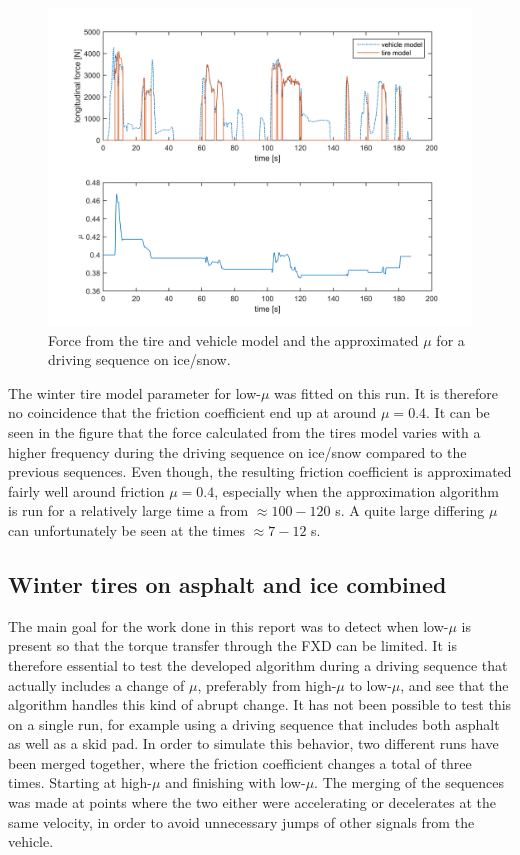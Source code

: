 \begin{figure}[h]
	\centering
	\includegraphics[width=1.0\textwidth]{Pictures/force_mue_ice_normal}
	\caption {Force from the tire and vehicle model and the approximated $ \mu $ for a driving sequence on ice/snow.}
	\label{force_mue_ice_normal}
\end{figure}

The winter tire model parameter for low-$ \mu $ was fitted on this run. It is therefore no coincidence that the friction coefficient end up at around $ \mu = 0.4 $. It can be seen in the figure that the force calculated from the tires model varies with a higher frequency during the driving sequence on ice/snow compared to the previous sequences. Even though, the resulting friction coefficient is approximated fairly well around friction $ \mu = 0.4 $, especially when the approximation algorithm is run for a relatively large time a from $ \approx 100-120 $ s. A quite large differing $ \mu $ can unfortunately be seen at the times $ \approx 7  - 12$ s.

\subsection{Winter tires on asphalt and ice combined}
The main goal for the work done in this report was to detect when low-$ \mu $ is present so that the torque transfer through the FXD can be limited. It is therefore essential to test the developed algorithm during a driving sequence that actually includes a change of $ \mu $, preferably from high-$ \mu $ to low-$ \mu $, and see that the algorithm handles this kind of abrupt change. It has not been possible to test this on a single run, for example using a driving sequence that includes both asphalt as well as a skid pad. In order to simulate this behavior, two different runs have been merged together, where the friction coefficient changes a total of three times. Starting at high-$ \mu $ and finishing with low-$ \mu $. The merging of the sequences was made at points where the two either were accelerating or decelerates at the same velocity, in order to avoid unnecessary jumps of other signals from the vehicle. 

